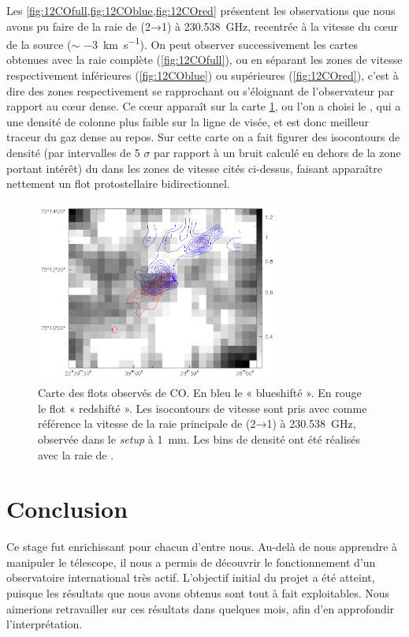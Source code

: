 \documentclass[a4paper,10pt,french]{article}
\newcommand{\setup}{\textit{setup}}
\newcommand{\unmm}{\SI{1}{\milli\meter}}
\begin{document}
Les \cref{fig:12COfull,fig:12COblue,fig:12COred} présentent les observations
que nous avons pu faire de la raie de  (2→1) à
\SI{230.538}{\giga\hertz}, recentrée à la vitesse du cœur de la source ($\sim$
\SI{-3}{\kilo\meter\per\second}). On peut observer successivement les cartes
obtenues avec la raie complète (\cref{fig:12COfull}), ou en séparant les zones
de vitesse respectivement inférieures (\cref{fig:12COblue}) ou supérieures
(\cref{fig:12COred}), c’est à dire des zones respectivement se rapprochant ou
s’éloignant de l’observateur par rapport au cœur dense. Ce cœur apparaît sur la
carte \cref{fig:mapC17O}, ou l’on a choisi le , qui a une densité de
colonne plus faible sur la ligne de visée, et est donc meilleur traceur du gaz
dense au repos. Sur cette carte on a fait figurer des isocontours de densité
(par intervalles de 5 $\sigma$ par rapport à un bruit calculé en dehors de la
zone portant intérêt) du  dans les zones de vitesse cités ci-dessus,
faisant apparaître nettement un flot protostellaire bidirectionnel.

\begin{figure}[ht]
    \centering
    \includegraphics[height=6cm]{mapC17O.png}
    \caption{
        Carte des flots observés de CO. En bleu le  « blueshifté ».
        En rouge le flot « redshifté ». Les isocontours de vitesse sont pris
        avec comme référence la vitesse de la raie principale de 
        (2→1) à \SI{230.538}{\giga\hertz}, observée dans le \setup{} à \unmm.
        Les bins de densité ont été réalisés avec la raie de .
    }
    \label{fig:mapC17O}
\end{figure}

\section*{Conclusion}

Ce stage fut enrichissant pour chacun d’entre nous. Au-delà de nous apprendre à
manipuler le télescope, il nous a permis de découvrir le fonctionnement d’un
observatoire international très actif. L’objectif initial du projet a été
atteint, puisque les résultats que nous avons obtenus sont tout à fait
exploitables. Nous aimerions retravailler sur ces résultats dans quelques mois,
afin d’en approfondir l’interprétation.
\end{document}
